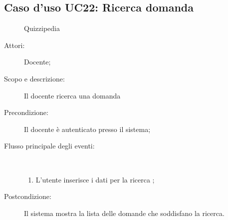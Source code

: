 \subsection{Caso d'uso UC22: Ricerca domanda}
	\begin{figure}[H]
		\centering
		\begin{resizedtikzpicture}{\textwidth}
		\begin{umlsystem}[x=0, fill=lightgray!20]{Quizzipedia}
		\end{umlsystem}
		\end{resizedtikzpicture}
		\caption{}
	\end{figure}
\begin{description}
\item[Attori:] Docente;
\item[Scopo e descrizione:] Il docente ricerca una domanda
      \item[Precondizione:] Il docente è autenticato presso il sistema;

        \item[Flusso principale degli eventi:] \ 
 \begin{enumerate}
          \item L'utente inserisce i dati per la ricerca	;

      \end{enumerate}
    \item[Postcondizione:] Il sistema mostra la lista delle domande che soddisfano la ricerca.
  \end{description}
\hypertarget{UC23}{}
